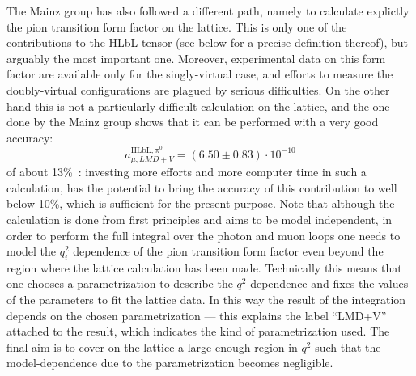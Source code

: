 \documentclass[epj]{webofc}
\newcommand{\<}{\langle}
\renewcommand{\>}{\rangle}
\begin{document}
The Mainz group has also followed a different path, namely to calculate
explictly the pion transition form factor on the lattice. This
is only one of the contributions to the HLbL tensor (see below for a
precise definition thereof), but arguably the most important one. Moreover,
experimental data on this form factor are available only for the
singly-virtual case, and efforts to measure the doubly-virtual
configurations are plagued by serious difficulties. On the other hand this
is not a particularly difficult calculation on the lattice, and the one
done by the Mainz group shows that it can be performed with a very good
accuracy:
\begin{equation}
a_{\mu,LMD+V}^\mathrm{HLbL,\pi^0}= (6.50 \pm 0.83) \cdot 10^{-10}
\end{equation}
of about 13\%~\cite{Gerardin:2016cqj,GerardinLat17}: investing more efforts and
more computer time in such a calculation, has the potential to bring the
accuracy of this contribution to well below 10\%, which is sufficient for
the present purpose. Note that although the calculation is done from first
principles and aims to be model independent, in order to perform the full
integral over the photon and muon loops one needs to model the $q_i^2$
dependence of the pion transition form factor even beyond the region where
the lattice calculation has been made. Technically this means that one
chooses a parametrization to describe the $q^2$ dependence and fixes the
values of the parameters to fit the lattice data. In this way the result of
the integration depends on the chosen parametrization --- this explains the
label ``LMD+V'' attached to the result, which indicates the kind of
parametrization used. The final aim is to cover on the lattice a large enough
region in $q^2$ such that the model-dependence due to the parametrization
becomes negligible.
\end{document}
